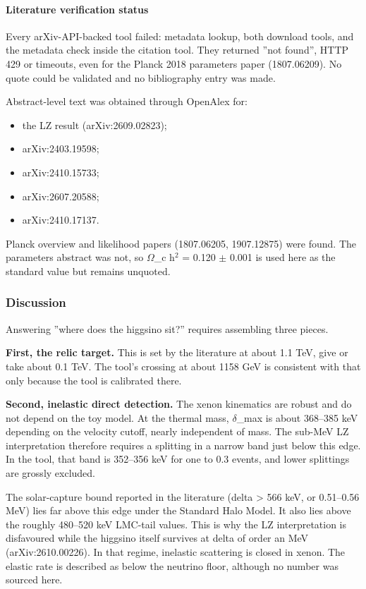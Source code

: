 \documentclass[11pt,a4paper]{article}
\begin{document}
\paragraph{Literature verification status}
Every arXiv-API-backed tool failed: metadata lookup, both download tools, and the metadata check inside the citation tool. They returned ''not found'', HTTP 429 or timeouts, even for the Planck 2018 parameters paper (1807.06209). No quote could be validated and no bibliography entry was made.

Abstract-level text was obtained through OpenAlex for:

\begin{itemize}
  \item the LZ result (arXiv:2609.02823);
  \item arXiv:2403.19598;
  \item arXiv:2410.15733;
  \item arXiv:2607.20588;
  \item arXiv:2410.17137.
\end{itemize}
Planck overview and likelihood papers (1807.06205, 1907.12875) were found. The parameters abstract was not, so $\Omega$\_c h$^2$ = 0.120 $\pm$ 0.001 is used here as the standard value but remains unquoted.

\subsubsection*{Discussion}
Answering ''where does the higgsino sit?'' requires assembling three pieces.

\textbf{First, the relic target.} This is set by the literature at about 1.1 TeV, give or take about 0.1 TeV. The tool's crossing at about 1158 GeV is consistent with that only because the tool is calibrated there.

\textbf{Second, inelastic direct detection.} The xenon kinematics are robust and do not depend on the toy model. At the thermal mass, $\delta$\_max is about 368--385 keV depending on the velocity cutoff, nearly independent of mass. The sub-MeV LZ interpretation therefore requires a splitting in a narrow band just below this edge. In the tool, that band is 352--356 keV for one to 0.3 events, and lower splittings are grossly excluded.

The solar-capture bound reported in the literature (delta \textgreater{} 566 keV, or 0.51--0.56 MeV) lies far above this edge under the Standard Halo Model. It also lies above the roughly 480--520 keV LMC-tail values. This is why the LZ interpretation is disfavoured while the higgsino itself survives at delta of order an MeV (arXiv:2610.00226). In that regime, inelastic scattering is closed in xenon. The elastic rate is described as below the neutrino floor, although no number was sourced here.
\end{document}
